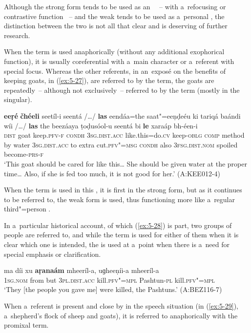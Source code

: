 Although the strong form tends to be used as an~ ~-- with a~refocusing or contrastive function \citep[432]{diessel2006}~-- and the weak tends to be used as a~personal , the distinction between the two is not all that clear and is deserving of further research.

When the  term is used anaphorically (without any additional exophorical function), it is usually coreferential with a~main character or a~referent with special focus. Whereas the other referents, in an~exposé on the benefits of keeping goats, in (\ref{ex:5-27}), are referred to by the  term, the goats are repeatedly~-- although not exclusively~-- referred to by the  term (mostly in the singular). 

\ea
\label{ex:5-27}
\gll \textbf{eeṛé} \textbf{čhéeli} seetíl-i seentá /{\ldots}/ \textbf{las} eendáa=the saat"=eeṇḍeéu ki tariqá baándi wíi /{\ldots}/ \textbf{las} the beezáaya ṭoḍusóol-u seentá bi \textbf{le} xaraáp bh-éen-i\\
\textsc{dist} goat keep.\textsc{pfv-f} \textsc{condh} {} \textsc{3sg.dist.acc} like.this=do.\textsc{cv} keep-\textsc{oblg} \textsc{comp} method by water {} \textsc{3sg.dist.acc} to extra cut.\textsc{pfv"=msg} \textsc{condh} also \textsc{3fsg}.\textsc{dist.nom} spoiled become-\textsc{prs-f}\\
\glt `This goat should be cared for like this{\ldots} She should be given water at the proper time{\ldots} Also, if she is fed too much, it is not good for her.' (A:KEE012-4)
\z
 
When the term is used in this , it is first in the strong form, but as it continues to be referred to, the weak form is used, thus functioning more like a~regular third"=person .

In a~particular historical account, of which (\ref{ex:5-28}) is part, two groups of people are referred to, and while the  term is used for either of them when it is clear which one is intended, the  is used at a~point when there is a~need for special emphasis or clarification.

\begin{exe}
\ex
\label{ex:5-28}
\gll ma díi xu \textbf{aṛanaám} mheeríl-a, uɡheeṇíi-a mheeríl-a\\
\textsc{1sg}.\textsc{nom} from but \textsc{3pl.}\textsc{dist.acc} kill.\textsc{pfv"=mpl} Pashtun-\textsc{pl} kill.\textsc{pfv"=mpl}\\
\glt `They [the people you gave me] were killed, the Pashtuns.' (A:BEZ116-7)\\
\end{exe}
When a~referent is present and close by in the speech situation (in (\ref{ex:5-29}), a~shepherd's flock of sheep and goats), it is referred to anaphorically with the promixal term.

